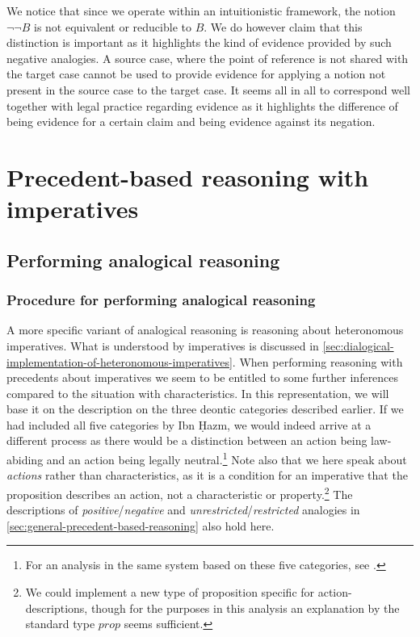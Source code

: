 		We notice that since we operate within an intuitionistic framework, the notion $\neg \neg B$ is not equivalent or reducible to $B$. We do however claim that this distinction is important as it highlights the kind of evidence provided by such negative analogies. A source case, where the point of reference is not shared with the target case cannot be used to provide evidence for applying a notion not present in the source case to the target case. It seems all in all to correspond well together with legal practice regarding evidence as it highlights the difference of being evidence for a certain claim and being evidence against its negation.




\section{Precedent-based reasoning with imperatives}\label{sec:precedent-based-reasoning-with-heteronomous-imperatives}

	\subsection{Performing analogical reasoning}
		
		\subsubsection{Procedure for performing analogical reasoning}
		
		A more specific variant of analogical reasoning is reasoning about heteronomous imperatives. What is understood by imperatives is discussed in \autoref{sec:dialogical-implementation-of-heteronomous-imperatives}. When performing reasoning with precedents about imperatives we seem to be entitled to some further inferences compared to the situation with characteristics. In this representation, we will base it on the description on the three deontic categories described earlier. If we had included all five categories by Ibn \d{H}azm, we would indeed arrive at a different process as there would be a distinction between an action being law-abiding and an action being legally neutral.\footnote{For an analysis in the same system based on these five categories, see \textcite{Kvernenes2020}.} Note also that we here speak about \textit{actions} rather than characteristics, as it is a condition for an imperative that the proposition describes an action, not a characteristic or property.\footnote{We could implement a new type of proposition specific for action-descriptions, though for the purposes in this analysis an explanation by the standard type $prop$ seems sufficient.} The descriptions of \textit{positive}/\textit{negative} and \textit{unrestricted}/\textit{restricted} analogies in \autoref{sec:general-precedent-based-reasoning} also hold here. 
		
